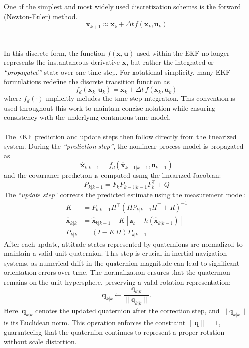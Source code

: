 One of the simplest and most widely used discretization schemes is the forward (Newton-Euler) method.
$$
    \mathbf{x}_{k+1} \approx \mathbf{x}_k + \Delta t \, f(\mathbf{x}_k, \mathbf{u}_k)
$$  
\\ \\
In this discrete form, the function $f(\mathbf{x}, \mathbf{u})$ used within the EKF no longer represents the instantaneous derivative $\dot{\mathbf{x}}$, but rather the integrated or \textit{``propagated''} state over one time step. For notational simplicity, many EKF formulations redefine the discrete transition function as
$$
    f_d(\mathbf{x}_k, \mathbf{u}_k) = \mathbf{x}_k + \Delta t \, f(\mathbf{x}_k, \mathbf{u}_k)
$$
where $f_d(\cdot)$ implicitly includes the time step integration. This convention is used throughout this work to maintain concise notation while ensuring consistency with the underlying continuous time model.
\\ \\
The EKF prediction and update steps then follow directly from the linearized system. During the \textit{``prediction step''}, the nonlinear process model is propagated as
$$
    \hat{\mathbf{x}}_{k|k-1} = f_d(\hat{\mathbf{x}}_{k-1|k-1}, \mathbf{u}_{k-1})
$$
and the covariance prediction is computed using the linearized Jacobian:
$$
    P_{k|k-1} = F_k P_{k-1|k-1} F_k^\top + Q
$$
The \textit{``update step''} corrects the predicted estimate using the measurement model:
$$
\begin{aligned}
    K &= P_{k|k-1}H^\top(HP_{k|k-1}H^\top + R)^{-1} \\
    \hat{\mathbf{x}}_{k|k} &= \hat{\mathbf{x}}_{k|k-1} + K[\mathbf{z}_k - h(\hat{\mathbf{x}}_{k|k-1})] \\
    P_{k|k} &= (I - K\,H)P_{k|k-1}
\end{aligned}
$$
After each update, attitude states represented by quaternions are normalized to maintain a valid unit quaternion. This step is crucial in inertial navigation systems, as numerical drift in the quaternion magnitude can lead to significant orientation errors over time. The normalization ensures that the quaternion remains on the unit hypersphere, preserving a valid rotation representation:
$$
    \mathbf{q}_{k|k} \leftarrow \frac{\mathbf{q}_{k|k}}{\|\mathbf{q}_{k|k}\|}.
$$
Here, $\mathbf{q}_{k|k}$ denotes the updated quaternion after the correction step, and $\|\mathbf{q}_{k|k}\|$ is its Euclidean norm. This operation enforces the constraint $\|\mathbf{q}\| = 1$, guaranteeing that the quaternion continues to represent a proper rotation without scale distortion.
